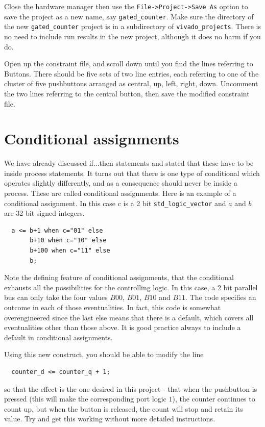 \documentclass[../physical_computing.tex]{subfiles}
\begin{document}
Close the hardware manager then use the \texttt{File->Project->Save As} option to save the project as a new name,
say \texttt{gated\_counter}. Make sure the directory of the new  \texttt{gated\_counter} project is in a subdirectory of \texttt{vivado\_projects}. There is no need to include run results in the new project, although it does no harm if you do.

Open up the constraint file, and scroll down until you find the lines referring to Buttons. There should be five sets of two line entries, each referring to one of the cluster of five pushbuttons arranged as 
central, up, left, right, down. Uncomment the two lines referring to the central button, then save the modified constraint file.

\section{Conditional assignments}
\label{sec:conditionalassignments}

We have already discussed if...then statements and stated that these have to be inside process statements. It turns out that there is one type of conditional which operates slightly differently, and as a consequence should never be inside a process. These are called
conditional assignments. Here is an example of a conditional assignment. In this case c is a 2 bit \texttt{std\_logic\_vector} and $a$ and $b$ are 32 bit signed integers.

\begin{verbatim}
  a <= b+1 when c="01" else
       b+10 when c="10" else
       b+100 when c="11" else
       b;
\end{verbatim}

Note the defining feature of conditional assignments, that the conditional exhausts all the possibilities for the controlling logic. In this case, a 2 bit parallel bus can only take the four values $B00$, $B01$, $B10$ and $B11$. The code specifies an outcome in each of those eventualities. In fact, this code is somewhat overengineered since the last else means that there is a default, which covers all eventualities other than those above. It is good practice always to include a default in conditional assignments.

Using this new construct, you should be able to modify the line
\begin{verbatim}
  counter_d <= counter_q + 1; 
\end{verbatim}
so that the effect is the one desired in this project - that when the pushbutton is pressed (this will make the corresponding port logic $1$), the counter continues to count up, but when the button is released, the count will stop and retain its value. Try and get this working without more detailed instructions.
\end{document}
